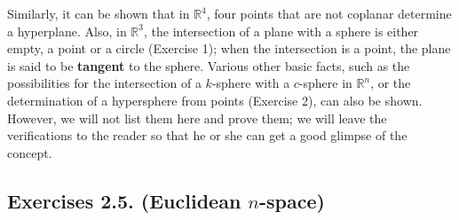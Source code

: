 \documentclass[leqno]{book}
\begin{document}
\noindent Similarly, it can be shown that in $\mathbb R^4$, four points that are not coplanar determine a hyperplane.  Also, in $\mathbb R^3$, the intersection of a plane with a sphere is either empty, a point or a circle (Exercise 1); when the intersection is a point, the plane is said to be \textbf{tangent} to the sphere.  Various other basic facts, such as the possibilities for the intersection of a $k$-sphere with a $c$-sphere in $\mathbb R^n$, or the determination of a hypersphere from points (Exercise 2), can also be shown.  However, we will not list them here and prove them; we will leave the verifications to the reader so that he or she can get a good glimpse of the concept.

\subsection*{Exercises 2.5. (Euclidean $n$-space)}
\end{document}
